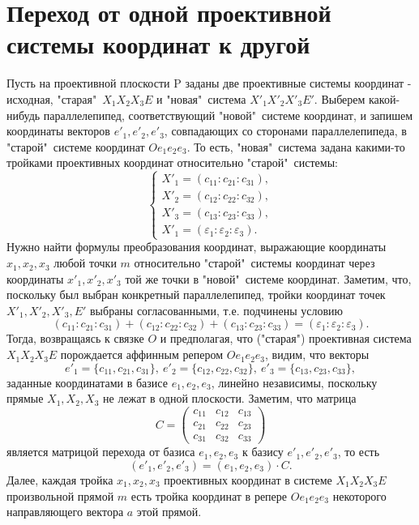 \documentclass[a4paper, 12pt]{article}
\renewcommand{\epsilon}{\varepsilon}
\theoremstyle{definition}
\begin{document}
\section{Переход от одной проективной системы координат к другой}
Пусть на проективной плоскости P заданы две проективные системы координат - исходная, "старая"\ $X_1X_2X_3E$ и "новая"\ система $X'_1X'_2X'_3E'$. Выберем какой-нибудь параллелепипед, соответствующий "новой"\ системе координат, и запишем координаты векторов $e'_1, e'_2, e'_3$, совпадающих со сторонами параллелепипеда, в "старой"\ системе координат $Oe_1e_2e_3$. То есть, "новая"\ система задана какими-то тройками проективных координат относительно "старой"\ системы:
\[ \begin{cases}
    X'_1 = (c_{11} : c_{21} : c_{31}), \\
    X'_2 = (c_{12} : c_{22} : c_{32}), \\
    X'_3 = (c_{13} : c_{23} : c_{33}), \\
    X'_1 = (\epsilon_1 : \epsilon_2 : \epsilon_3).
\end{cases} \]
Нужно найти формулы преобразования координат, выражающие координаты $x_1, x_2, x_3$ любой точки $m$ относительно "старой"\ системы координат через координаты $x'_1, x'_2, x'_3$ той же точки в "новой"\ системе координат. Заметим, что, поскольку был выбран конкретный параллелепипед, тройки координат точек $X'_1, X'_2, X'_3, E'$ выбраны согласованными, т.е. подчинены условию
\[ (c_{11} : c_{21} : c_{31}) + (c_{12} : c_{22} : c_{32}) + (c_{13} : c_{23} : c_{33}) = (\epsilon_1 : \epsilon_2 : \epsilon_3). \]
Тогда, возвращаясь к связке $O$ и предполагая, что ("старая") проективная система $X_1X_2X_3E$ порождается аффинным репером $Oe_1e_2e_3$, видим, что векторы
\[ e'_1 = \{c_{11}, c_{21}, c_{31}\}, \ e'_2 = \{c_{12}, c_{22}, c_{32}\}, \ e'_3 = \{c_{13}, c_{23}, c_{33}\}, \]
заданные координатами в базисе $e_1, e_2, e_3$, линейно независимы, поскольку прямые $X_1, X_2, X_3$ не лежат в одной плоскости. Заметим, что матрица
\[C = \begin{pmatrix} c_{11}&c_{12}&c_{13} \\ c_{21}&c_{22}&c_{23} \\ c_{31}&c_{32}&c_{33} \end{pmatrix}\]
является матрицой перехода от базиса $e_1, e_2, e_3$ к базису $e'_1, e'_2, e'_3$, то есть
\[ (e'_1, e'_2, e'_3) = (e_1, e_2, e_3) \cdot C. \]
Далее, каждая тройка $x_1, x_2, x_3$ проективных координат в системе $X_1X_2X_3E$ произвольной прямой $m$ есть тройка координат в репере $Oe_1e_2e_3$ некоторого направляющего вектора $a$ этой прямой.
\end{document}
